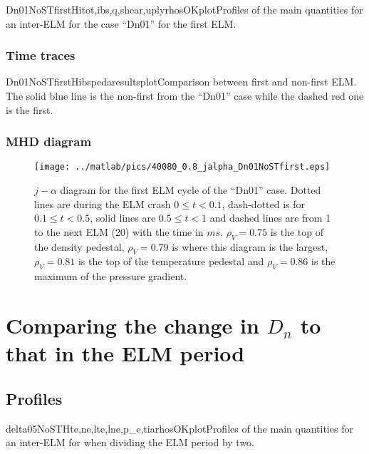 \begin{AllFigs}{Dn01NoSTfirst}{H}{}{itot,ibs,q,shear,upl}{y}{rhosOKplot}{Profiles of the main quantities for an inter-ELM for the case ``Dn01'' for the first ELM.}
\end{AllFigs}
\subsubsection{Time traces}\label{sec:app:graphs:recovery:first:Dn01:traces}
\begin{AllFigs}{Dn01NoSTfirst}{H}{}{ibsped}{a}{resultsplot}{Comparison between first and non-first ELM. The solid blue line is the non-first from the ``Dn01'' case while the dashed red one is the first.}
\end{AllFigs}
\subsubsection{MHD diagram}\label{sec:app:graphs:recovery:first:Dn01:jalpha}
\begin{figure}[H]
\begin{center}
\texttt{[image: ../matlab/pics/40080\_0.8\_jalpha\_Dn01NoSTfirst.eps]}
\vspace{-0.5cm}
\end{center}
\caption{\footnotesize $j - \alpha$ diagram for the first ELM cycle of the ``Dn01'' case. Dotted lines are during the ELM crash $0 \le t <0.1$, dash-dotted is for $0.1 \le t < 0.5$, solid lines are $0.5 \le t < 1$ and dashed lines are from 1 to the next ELM (20) with the time in $ms$. $\rho_V = 0.75$ is the top of the density pedestal, $\rho_V = 0.79$ is where this diagram is the largest, $\rho_V = 0.81$ is the top of the temperature pedestal and $\rho_V = 0.86$ is the maximum of the pressure gradient.\label{fig:results:ELM:Dn01first:jalpha}}
\vspace{-0.5cm}
\end{figure}
\section{Comparing the change in $D_n$ to that in the ELM period}\label{sec:app:graphs:recovery:delta}
\subsection{Profiles}\label{sec:app:graphs:recovery:delta:profiles}
\begin{AllFigs}{delta05NoST}{H}{}{te,ne,lte,lne,p_e,ti}{a}{rhosOKplot}{Profiles of the main quantities for an inter-ELM for when dividing the ELM period by two.}
\end{AllFigs}

